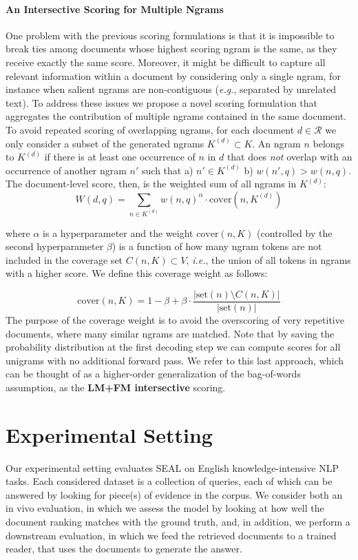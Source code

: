 \documentclass[11pt]{article}
\newcommand{\eg}{\textit{e.g.}}
\newcommand{\ie}{\textit{i.e.}}
\newcommand{\system}{\textsc{SEAL}}
\begin{document}
\paragraph{An Intersective Scoring for Multiple Ngrams}
One problem with the previous scoring formulations is that it is impossible to break ties among documents whose highest scoring ngram is the same, as they receive exactly the same score. Moreover, it might be difficult to capture all relevant information within a document by considering only a single ngram, for instance when salient ngrams are non-contiguous (\eg, separated by unrelated text).  
To address these issues we propose a novel scoring formulation that aggregates the contribution of multiple ngrams contained in the same document.
To avoid repeated scoring of overlapping ngrams, for each document $d \in \mathcal{R}$ we only consider a subset of the generated ngrams $K^{(d)} \subset K$. An ngram $n$ belongs to $K^{(d)}$ 
if there is at least one occurrence of $n$ in $d$ that does \textit{not} overlap with an occurrence of another ngram $n'$ such that a) $n' \in K^{(d)}$ b) $w(n', q) > w(n, q)$.
The document-level score, then, is the weighted sum of all ngrams in $K^{(d)}$:
\begin{equation}
W(d,q) = \sum_{n \in K^{(d)}} w(n, q)^\alpha \cdot \text{cover}(n, K^{(d)})
\label{eq:doc-score}
\end{equation}

\noindent
where $\alpha$ is a hyperparameter and the weight $\text{cover}(n, K)$ (controlled by the second hyperparameter $\beta$) is a function of how many ngram tokens are not included in the coverage set $C(n, K) \subset V$, \ie, the union of all tokens in ngrams with a higher score. We define this coverage weight as follows: 

\begin{equation}
    \text{cover}(n, K) = 1 - \beta + \beta \cdot \frac{|\text{set}(n) \setminus C(n, K) |}{|\text{set}(n)|}
\label{eq:cov-score}
\end{equation}
\noindent
The purpose of the coverage weight is to avoid the overscoring of very repetitive documents, where many similar ngrams are matched. Note that by saving the probability distribution at the first decoding step we can compute scores for all unigrams with no additional forward pass.
We refer to this last approach, which can be thought of as a higher-order generalization of the bag-of-words assumption, as the \textbf{LM+FM intersective} scoring. 


\section{Experimental Setting}
Our experimental setting evaluates \system{} on English knowledge-intensive NLP tasks. Each considered dataset is a collection of queries, each of which can be answered by looking for piece(s) of evidence in the corpus. We consider both an in vivo evaluation, in which we assess the model by looking at how well the document ranking matches with the ground truth, and, in addition, we perform a downstream evaluation, in which we feed the retrieved documents to a trained reader, that uses the documents to generate the answer.
\end{document}
